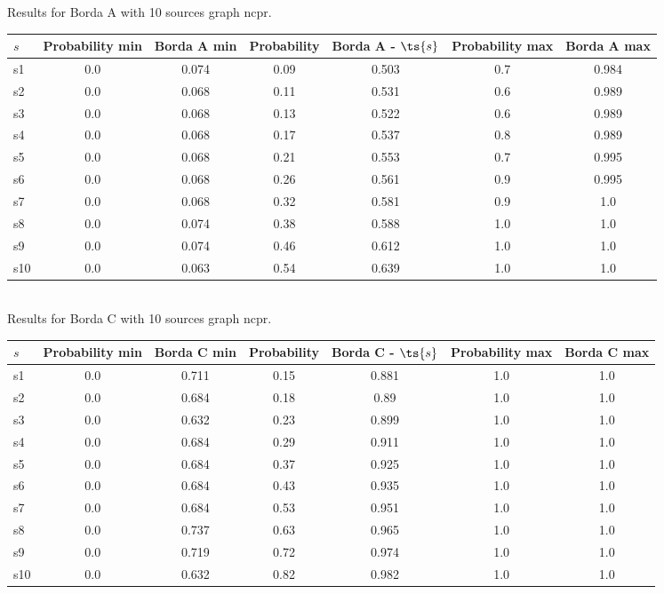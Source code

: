 \documentclass{article}
\begin{document}
\noindent Results for Borda A with 10 sources graph ncpr.

\noindent\begin{tabular}{|l|c|c|c|c|c|c|}
\hline
$s$& Probability min & Borda A min & Probability & Borda A - $\ts{s}$ & Probability max & Borda A max\\
\hline
s1 &0.0 & 0.074 & 0.09 & 0.503 & 0.7 & 0.984\\
\hline
s2 &0.0 & 0.068 & 0.11 & 0.531 & 0.6 & 0.989\\
\hline
s3 &0.0 & 0.068 & 0.13 & 0.522 & 0.6 & 0.989\\
\hline
s4 &0.0 & 0.068 & 0.17 & 0.537 & 0.8 & 0.989\\
\hline
s5 &0.0 & 0.068 & 0.21 & 0.553 & 0.7 & 0.995\\
\hline
s6 &0.0 & 0.068 & 0.26 & 0.561 & 0.9 & 0.995\\
\hline
s7 &0.0 & 0.068 & 0.32 & 0.581 & 0.9 & 1.0\\
\hline
s8 &0.0 & 0.074 & 0.38 & 0.588 & 1.0 & 1.0\\
\hline
s9 &0.0 & 0.074 & 0.46 & 0.612 & 1.0 & 1.0\\
\hline
s10 &0.0 & 0.063 & 0.54 & 0.639 & 1.0 & 1.0\\
\hline
\end{tabular}\\

\noindent Results for Borda C with 10 sources graph ncpr.

\noindent\begin{tabular}{|l|c|c|c|c|c|c|}
\hline
$s$& Probability min & Borda C min & Probability & Borda C - $\ts{s}$ & Probability max & Borda C max\\
\hline
s1 &0.0 & 0.711 & 0.15 & 0.881 & 1.0 & 1.0\\
\hline
s2 &0.0 & 0.684 & 0.18 & 0.89 & 1.0 & 1.0\\
\hline
s3 &0.0 & 0.632 & 0.23 & 0.899 & 1.0 & 1.0\\
\hline
s4 &0.0 & 0.684 & 0.29 & 0.911 & 1.0 & 1.0\\
\hline
s5 &0.0 & 0.684 & 0.37 & 0.925 & 1.0 & 1.0\\
\hline
s6 &0.0 & 0.684 & 0.43 & 0.935 & 1.0 & 1.0\\
\hline
s7 &0.0 & 0.684 & 0.53 & 0.951 & 1.0 & 1.0\\
\hline
s8 &0.0 & 0.737 & 0.63 & 0.965 & 1.0 & 1.0\\
\hline
s9 &0.0 & 0.719 & 0.72 & 0.974 & 1.0 & 1.0\\
\hline
s10 &0.0 & 0.632 & 0.82 & 0.982 & 1.0 & 1.0\\
\hline
\end{tabular}\\
\end{document}
